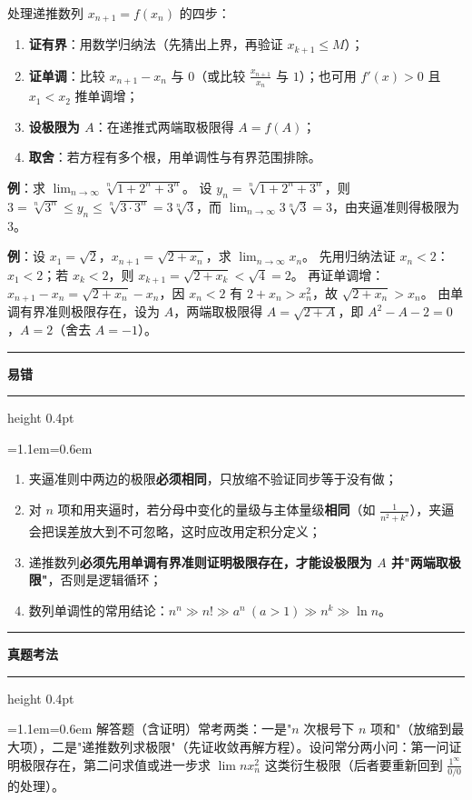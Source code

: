 \documentclass[11pt,openany,UTF8]{ctexbook}
\newcommand{\callouthead}[2]{%
  \par\addvspace{7pt}\noindent
  {\color{#1}\rule[-0.15em]{3pt}{1.05em}}\hspace{0.5em}%
  {\bfseries\color{#1}#2}\par\nobreak\vspace{-0.35em}%
  {\color{rulesep}\hrule height 0.4pt}\nobreak\vspace{0.45em}%
  \begingroup\small\setlength{\parindent}{0pt}%
  \leftskip=1.1em\rightskip=0.6em\noindent\ignorespaces}
\newcommand{\calloutend}{\par\endgroup\addvspace{7pt}}
\newenvironment{callwarn}[1]{\callouthead{warnbar}{#1}}{\calloutend}
\newenvironment{callexam}[1]{\callouthead{exambar}{#1}}{\calloutend}
\begin{document}
处理递推数列 $x_{n+1}=f(x_n)$ 的四步：

\begin{enumerate}
\item \textbf{证有界}：用数学归纳法（先猜出上界，再验证 $x_{k+1}\le M$）；
\item \textbf{证单调}：比较 $x_{n+1}-x_n$ 与 $0$（或比较 $\frac{x_{n+1}}{x_n}$ 与 $1$）；也可用 $f'(x)>0$ 且 $x_1<x_2$ 推单调增；
\item \textbf{设极限为 $A$}：在递推式两端取极限得 $A=f(A)$；
\item \textbf{取舍}：若方程有多个根，用单调性与有界范围排除。
\end{enumerate}
\textbf{例}：求 $\lim_{n\to\infty}\sqrt[n]{1+2^{n}+3^{n}}$。 设 $y_n=\sqrt[n]{1+2^n+3^n}$，则 $3=\sqrt[n]{3^n}\le y_n\le\sqrt[n]{3\cdot 3^n}=3\sqrt[n]{3}$，而 $\lim_{n\to\infty}3\sqrt[n]{3}=3$，由夹逼准则得极限为 $3$。

\textbf{例}：设 $x_1=\sqrt2$，$x_{n+1}=\sqrt{2+x_n}$，求 $\lim_{n\to\infty}x_n$。 先用归纳法证 $x_n<2$：$x_1<2$；若 $x_k<2$，则 $x_{k+1}=\sqrt{2+x_k}<\sqrt4=2$。 再证单调增：$x_{n+1}-x_n=\sqrt{2+x_n}-x_n$，因 $x_n<2$ 有 $2+x_n>x_n^2$，故 $\sqrt{2+x_n}>x_n$。 由单调有界准则极限存在，设为 $A$，两端取极限得 $A=\sqrt{2+A}$，即 $A^2-A-2=0$，$A=2$（舍去 $A=-1$）。

\begin{callwarn}{易错}
\begin{enumerate}
\item 夹逼准则中两边的极限\textbf{必须相同}，只放缩不验证同步等于没有做；
\item 对 $n$ 项和用夹逼时，若分母中变化的量级与主体量级\textbf{相同}（如 $\frac{1}{n^2+k^2}$），夹逼会把误差放大到不可忽略，这时应改用定积分定义；
\item 递推数列\textbf{必须先用单调有界准则证明极限存在，才能设极限为 $A$ 并"两端取极限"}，否则是逻辑循环；
\item 数列单调性的常用结论：$n^n\gg n!\gg a^n\ (a>1)\gg n^k\gg\ln n$。
\end{enumerate}
\end{callwarn}

\begin{callexam}{真题考法}
解答题（含证明）常考两类：一是"$n$ 次根号下 $n$ 项和"（放缩到最大项），二是"递推数列求极限"（先证收敛再解方程）。设问常分两小问：第一问证明极限存在，第二问求值或进一步求 $\lim nx_n^2$ 这类衍生极限（后者要重新回到 $\frac{1^\infty}{0/0}$ 的处理）。

\end{callexam}
\end{document}

